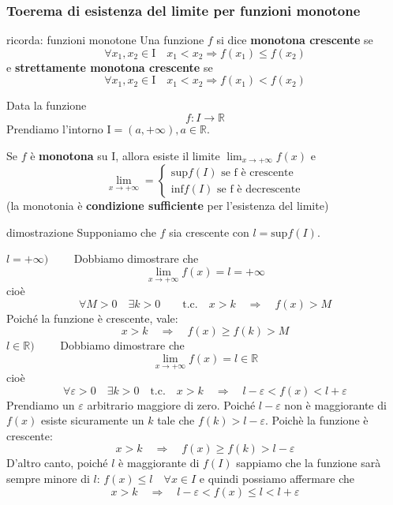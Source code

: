 \documentclass[x11names]{article}
\begin{document}
	\begin{center}
		\colorbox{myred}{\begin{minipage}{5.75in}
				\begin{redes}{}
					\subsubsection{Toerema di esistenza del limite per funzioni monotone}
					\begin{redes}{ricorda: funzioni monotone}
						Una funzione $f$ si dice \textbf{monotona crescente} se
						\[
						\forall x_1, x_2 \in \text{I} \quad x_1 < x_2 \Longrightarrow f(x_1) \leq f(x_{2}) 
						\]
						e \textbf{strettamente monotona crescente} se
						\[
						\forall x_1, x_2 \in \text{I} \quad x_1 < x_2 \Longrightarrow f(x_1) < f(x_{2}) 
						\]
					\end{redes}
					Data la funzione
					\[
					f: I \rightarrow \mathbb{R}
					\]
					Prendiamo l'intorno $\text{I} = (a,+\infty), a \in \mathbb{R}$.
					
					Se $f$ è \textbf{monotona} su $\text{I}$, allora esiste il limite $\lim_{x \to +\infty}f(x)$ e 
					\[
					\lim_{x \to +\infty} = 
					\begin{cases}
						\text{sup}f(I) \text{ se f è crescente}  \\
						\text{inf}f(I) \text{ se f è decrescente} 
					\end{cases}
					\]
					(la monotonia è \textbf{condizione sufficiente} per l'esistenza del limite)
				\end{redes}
		\end{minipage}}        
	\end{center}
	
	\begin{es}{dimostrazione}
		Supponiamo che $f$ sia crescente con $l = \text{sup}f(I)$.
		
		$l = + \infty\text{)} \qquad$ Dobbiamo dimostrare che
		\[
		\lim_{x \to + \infty}f(x) = l = + \infty
		\]
		cioè
		\[
		\forall M > 0 \quad \exists k > 0  \qquad \text{t.c.} \quad x > k  \quad \Longrightarrow \quad f(x) > M
		\]
		Poiché la funzione è crescente, vale:
		\[
		x > k \quad \Longrightarrow \quad f(x) \geq f(k) > M
		\]
		$l \in \mathbb{R} \text{)} \qquad$ Dobbiamo dimostrare che 
		\[
		\lim_{x \to + \infty}f(x) = l \in \mathbb{R}
		\]
		cioè
		\[
		\forall \varepsilon > 0 \quad \exists k > 0 \quad \text{t.c.} \quad x>k \quad \Longrightarrow \quad l -\varepsilon < f(x) < l + \varepsilon
		\]
		Prendiamo un $\varepsilon$ arbitrario maggiore di zero. Poiché $l-\varepsilon$ non è maggiorante di $f(x)$ esiste sicuramente un $k$ tale che $f(k) > l - \varepsilon$. Poichè la funzione è crescente:
		\[
		x > k \quad \Longrightarrow \quad f(x) \geq f(k) > l - \varepsilon
		\]
		D'altro canto, poiché $l$ è maggiorante di $f(I)$ sappiamo che la funzione sarà sempre minore di $l$: $f(x) \leq l \quad \forall x \in I$ e quindi possiamo affermare che
		\[
		x > k \quad \Longrightarrow \quad l - \varepsilon < f(x) \leq l < l + \varepsilon
		\]
	\end{es}
	
\end{document}
